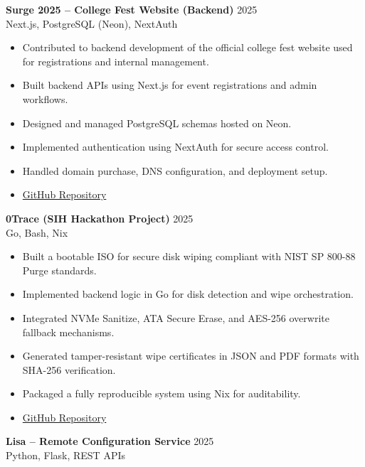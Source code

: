 \documentclass[a4paper,10pt]{article}
\begin{document}
\textbf{Surge 2025 – College Fest Website (Backend)} \hfill 2025 \\
Next.js, PostgreSQL (Neon), NextAuth

\begin{itemize}[noitemsep, topsep=2pt]
    \item Contributed to backend development of the official college fest website used for registrations and internal management.
    \item Built backend APIs using Next.js for event registrations and admin workflows.
    \item Designed and managed PostgreSQL schemas hosted on Neon.
    \item Implemented authentication using NextAuth for secure access control.
    \item Handled domain purchase, DNS configuration, and deployment setup.
    \item \href{https://github.com/eklavya172004/Surge-website-2025}{GitHub Repository}
\end{itemize}

\par\noindent
\textbf{0Trace (SIH Hackathon Project)} \hfill 2025 \\
Go, Bash, Nix

\begin{itemize}[noitemsep, topsep=2pt]
    \item Built a bootable ISO for secure disk wiping compliant with NIST SP 800-88 Purge standards.
    \item Implemented backend logic in Go for disk detection and wipe orchestration.
    \item Integrated NVMe Sanitize, ATA Secure Erase, and AES-256 overwrite fallback mechanisms.
    \item Generated tamper-resistant wipe certificates in JSON and PDF formats with SHA-256 verification.
    \item Packaged a fully reproducible system using Nix for auditability.
    \item \href{https://github.com/spuckhafte/0trace}{GitHub Repository}
\end{itemize}

\par\noindent
\textbf{Lisa – Remote Configuration Service} \hfill 2025 \\
Python, Flask, REST APIs
\end{document}
